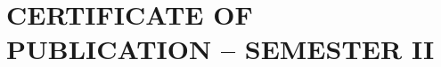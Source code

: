 \documentclass[oneside,a4paper,12pt]{book}
\begin{document}
\chapter{CERTIFICATE OF PUBLICATION – SEMESTER II}
\begin{center}
    \begin{figure}[!htbp]
        \centering
    \end{figure}
\end{center}
\end{document}
